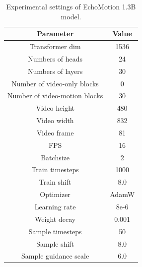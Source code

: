 \begin{table}[ht]
\setlength{\abovecaptionskip}{0.2cm}
\setlength{\belowcaptionskip}{-0.4cm}
\centering
\caption{Experimental settings of EchoMotion 1.3B model.}
\setlength{\tabcolsep}{10mm}
\begin{tabular}{cc}
\hline
\textbf{Parameter}    & \textbf{Value} \\ \hline
Transformer dim       & 1536           \\
Numbers of heads      & 24             \\
Numbers of layers     & 30             \\
Number of video-only blocks & 0        \\
Number of video-motion blocks & 30     \\
Video height          & 480            \\
Video width           & 832            \\
Video frame           & 81            \\
FPS                   & 16             \\
Batchsize             & 2              \\
Train timesteps       & 1000           \\
Train shift           & 8.0            \\
Optimizer             & AdamW          \\
Learning rate         & 8e-6           \\
Weight decay          & 0.001          \\
Sample timesteps      & 50             \\
Sample shift          & 8.0            \\
Sample guidance scale & 6.0            \\ \hline
\end{tabular}
\label{tab:settings_1b}
\vspace{5mm}
\end{table}